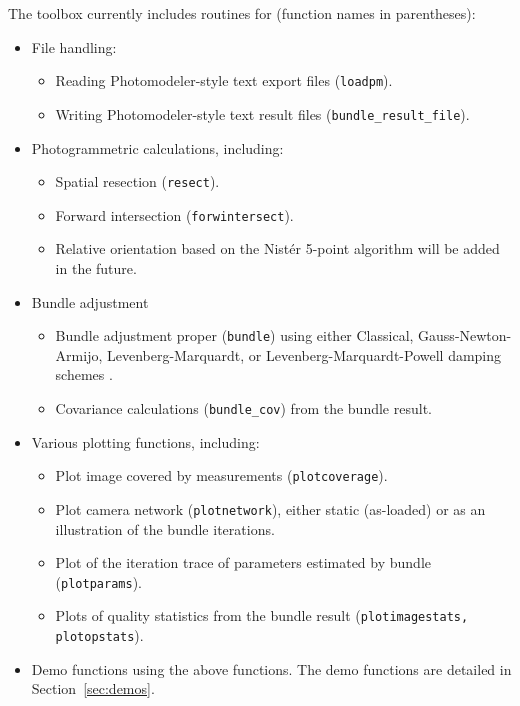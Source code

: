 \documentclass{article}
\begin{document}
The toolbox currently includes routines for (function names in parentheses):
\begin{itemize}
\item File handling:
  \begin{itemize}
  \item Reading Photomodeler-style text export files (\texttt{loadpm}).
  \item Writing Photomodeler-style text result files
    (\texttt{bundle\_result\_file}).
  \end{itemize}
\item Photogrammetric calculations, including:
  \begin{itemize}
  \item Spatial resection (\texttt{resect}).
  \item Forward intersection (\texttt{forwintersect}).
  \item Relative orientation based on the Nist{\'e}r 5-point algorithm
    \citep{Stewenius2006:Recent} will be added in the future.
  \end{itemize}
\item Bundle adjustment
  \begin{itemize}
  \item Bundle adjustment proper (\texttt{bundle}) using either
    Classical, Gauss-Newton-Armijo, Levenberg-Marquardt, or
    Levenberg-Marquardt-Powell damping schemes
    \citep{Borlin2013:Bundle,Borlin2014:Camera}.
  \item Covariance calculations (\texttt{bundle\_cov}) from the bundle
    result.
  \end{itemize}
\item Various plotting functions, including:
  \begin{itemize}
  \item Plot image covered by measurements
    (\texttt{plotcoverage}).
  \item Plot camera network (\texttt{plotnetwork}), either static
    (as-loaded) or as an illustration of the bundle iterations.
  \item Plot of the iteration trace of parameters estimated by bundle
    (\texttt{plotparams}).
  \item Plots of quality statistics from the bundle result
    (\texttt{plotimagestats, plotopstats}).
  \end{itemize}
\item Demo functions using the above functions. The demo functions are
  detailed in Section~\ref{sec:demos}.
\end{itemize}
\end{document}

